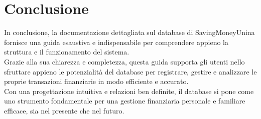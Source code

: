 \chapter{Conclusione}

In conclusione, la documentazione dettagliata sul database di SavingMoneyUnina
fornisce una guida esaustiva e indispensabile per comprendere appieno la struttura
e il funzionamento del sistema.\\

Grazie alla sua chiarezza e completezza, questa guida supporta gli utenti nello
sfruttare appieno le potenzialità del database per registrare, gestire e analizzare
le proprie transazioni finanziarie in modo efficiente e accurato.\\

Con una progettazione intuitiva e relazioni ben definite,
il database si pone come uno strumento fondamentale per una gestione
finanziaria personale e familiare efficace, sia nel presente che nel futuro.